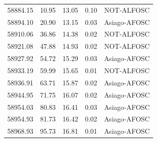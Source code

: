 \begin{longtable}{|c|c|c|c|c|}
 58884.15 &   10.95 &       13.05 &          0.10 & NOT-ALFOSC  \\
 58894.10 &   20.90 &       13.15 &          0.03 & Asiago-AFOSC \\
 58910.06 &   36.86 &       14.38 &          0.02 & NOT-ALFOSC  \\
 58921.08 &   47.88 &       14.93 &          0.02 & NOT-ALFOSC  \\
 58927.92 &   54.72 &       15.29 &          0.03 & Asiago-AFOSC \\
 58933.19 &   59.99 &       15.65 &          0.01 & NOT-ALFOSC  \\
 58936.91 &   63.71 &       15.87 &          0.02 & Asiago-AFOSC \\
 58944.95 &   71.75 &       16.07 &          0.02 & Asiago-AFOSC \\
 58954.03 &   80.83 &       16.41 &          0.03 & Asiago-AFOSC \\
 58954.93 &   81.73 &       16.42 &          0.02 & Asiago-AFOSC \\
 58968.93 &   95.73 &       16.81 &          0.01 & Asiago-AFOSC \\
 \end{longtable}

